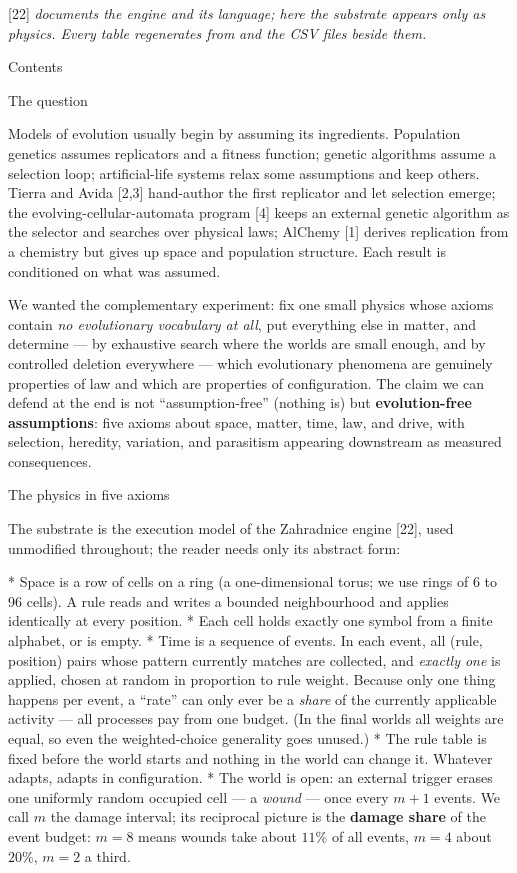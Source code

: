 \medskip
{} [22] {\it documents the engine and its language; here
the substrate appears only as physics. Every table regenerates
from}  {\it and the CSV files
beside them.}

\bigskip
{\nonum\notoc\sec Contents}
\maketoc
\bigskip

\sec The question

Models of evolution usually begin by assuming its ingredients.
Population genetics assumes replicators and a fitness function;
genetic algorithms assume a selection loop; artificial-life systems
relax some assumptions and keep others. Tierra and Avida [2,3]
hand-author the first replicator and let selection emerge; the
evolving-cellular-automata program [4] keeps an external genetic
algorithm as the selector and searches over physical laws; AlChemy
[1] derives replication from a chemistry but gives up space and
population structure. Each result is conditioned on what was
assumed.

We wanted the complementary experiment: fix one small physics whose
axioms contain {\it no evolutionary vocabulary at all}, put
everything else in matter, and determine --- by exhaustive search
where the worlds are small enough, and by controlled deletion
everywhere --- which evolutionary phenomena are genuinely properties
of law and which are properties of configuration. The claim we can
defend at the end is not “assumption-free” (nothing is) but
{\bf evolution-free assumptions}: five axioms about space, matter,
time, law, and drive, with selection, heredity, variation, and
parasitism appearing downstream as measured consequences.

\sec The physics in five axioms

The substrate is the execution model of the Zahradnice engine [22],
used unmodified throughout; the reader needs only its abstract
form:

\begitems
*  Space is a row of cells on a ring (a
one-dimensional torus; we use rings of 6 to 96 cells). A rule reads
and writes a bounded neighbourhood and applies identically at every
position.
*  Each cell holds exactly one symbol from a
finite alphabet, or is empty.
*  Time is a sequence of events. In
each event, all (rule, position) pairs whose pattern currently
matches are collected, and {\it exactly one} is applied, chosen at
random in proportion to rule weight. Because only one thing happens
per event, a “rate” can only ever be a {\it share} of the
currently applicable activity --- all processes pay from one budget.
(In the final worlds all weights are equal, so even the
weighted-choice generality goes unused.)
*  The rule table is fixed before the world
starts and nothing in the world can change it. Whatever adapts,
adapts in configuration.
*  The world is open: an external trigger erases
one uniformly random occupied cell --- a {\it wound} --- once every
$m{+}1$ events. We call $m$ the damage interval; its reciprocal
picture is the {\bf damage share} of the event budget: $m{=}8$
means wounds take about $11\%$ of all events, $m{=}4$ about
$20\%$, $m{=}2$ a third.
\enditems

